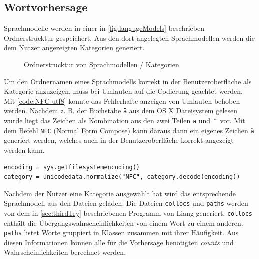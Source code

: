 \subsection{Wortvorhersage}
	
    Sprachmodelle werden in einer in \autoref{fig:langugeModels} beschrieben Ordnerstrucktur gespeichert. Aus den dort angelegten Sprachmodellen werden die dem Nutzer angezeigten Kategorien generiert.
    
    \begin{figure}[H]
            \caption{Ordnerstrucktur von Sprachmodellen / Kategorien}
			\label{fig:langugeModels}
	\end{figure}
    
    Um den Ordnernamen eines Sprachmodells korrekt in der Benutzeroberfläche als Kategorie anzuzeigen, muss bei Umlauten auf die Codierung geachtet werden. Mit \autoref{code:NFC-utf8} konnte das Fehlerhafte anzeigen von Umlauten behoben werden. Nachdem z. B. der Buchstabe \texttt{ä} aus dem OS X Dateisystem gelesen wurde liegt das Zeichen als Kombination aus den zwei Teilen \texttt{a} und \includegraphics[]{images/dots.png} vor. Mit dem Befehl \texttt{NFC} (Normal Form Compose) kann daraus dann ein eigenes Zeichen \texttt{ä} generiert werden, welches auch in der Benutzeroberfläche korrekt angezeigt werden kann.
    
    \begin{lstlisting}[caption=Dekodierung von Ordnernamen,label=code:NFC-utf8, captionpos=b]
encoding = sys.getfilesystemencoding()
category = unicodedata.normalize("NFC", category.decode(encoding))
    \end{lstlisting}
    
    Nachdem der Nutzer eine Kategorie ausgewählt hat wird das entsprechende Sprachmodell aus den Dateien geladen. Die Dateien \texttt{collocs} und \texttt{paths} werden von dem in \autoref{sec:thirdTry} beschriebenen Programm von Liang generiert. \texttt{collocs} enthält die Übergangswahrscheinlichkeiten von einem Wort zu einem anderen. \texttt{paths} listet Worte gruppiert in Klassen zusammen mit ihrer Häufigkeit. Aus diesen Informationen können alle für die Vorhersage benötigten \emph{counts} und Wahrscheinlichkeiten berechnet werden.
    
